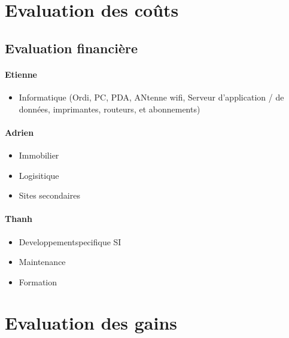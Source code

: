\section{Evaluation des coûts}

    \subsection{Evaluation financière}
        \paragraph{Etienne}
        \begin{itemize}
            \item Informatique (Ordi, PC, PDA, ANtenne wifi, Serveur d'application / de données, imprimantes, routeurs, et abonnements)
        \end{itemize}
        
        \paragraph{Adrien}
        \begin{itemize}
            \item Immobilier
            \item Logisitique
            \item Sites secondaires
        \end{itemize}
        
        \paragraph{Thanh}
        \begin{itemize}
            \item Developpementspecifique SI
            \item Maintenance
            \item Formation
        \end{itemize}

\section{Evaluation des gains}

